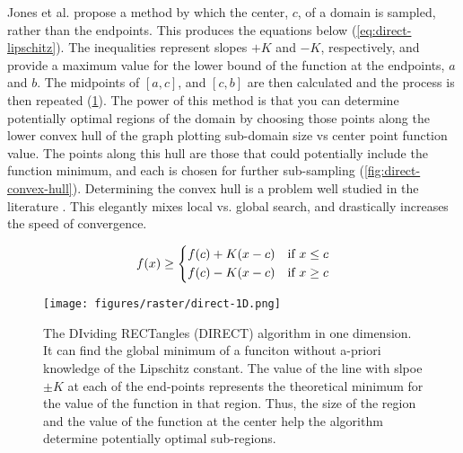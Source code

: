 Jones et al. \cite{jonesLipschitzianOptimizationLipschitz1993} propose a method by which the center, $c$, of a domain is sampled, rather than the endpoints. This produces the equations below (\cref{eq:direct-lipschitz}). The inequalities represent slopes $+K$ and $-K$, respectively, and provide a maximum value for the lower bound of the function at the endpoints, $a$ and $b$. The midpoints of $[a,c]$, and $[c,b]$ are then calculated and the process is then repeated (\cref{fig:direct-1D}). The power of this method is that you can determine potentially optimal regions of the domain by choosing those points along the lower convex hull of the graph plotting sub-domain size vs center point function value. The points along this hull are those that could potentially include the function minimum, and each is chosen for further sub-sampling (\cref{fig:direct-convex-hull}). Determining the convex hull is a problem well studied in the literature \cite{barberQuickhullAlgorithmConvex1996,chanOptimalOutputsensitiveConvex1996,jarvisIdentificationConvexHull1973,grahamEfficientAlgorithDetermining1972}. This elegantly mixes local vs. global search, and drastically increases the speed of convergence.


\begin{equation}
    f(x) \ge \begin{dcases}
        f(c) + K(x-c) & \text{if  } x \le c \\
        f(c) - K(x-c) & \text{if  } x \ge c
    \end{dcases}
    \label{eq:direct-lipschitz}
\end{equation}

\begin{figure}[h!]
    \begin{center}
        \texttt{[image: figures/raster/direct-1D.png]}
    \end{center}
    \caption[The DIviding RECTangles (DIRECT) algorithm in one dimension]{The DIviding RECTangles (DIRECT) algorithm in one dimension. It can find the global minimum of a funciton without a-priori knowledge of the Lipschitz constant. The value of the line with slpoe $\pm K$ at each of the end-points represents the theoretical minimum for the value of the function in that region. Thus, the size of the region and the value of the function at the center help the algorithm determine potentially optimal sub-regions.}
    \label{fig:direct-1D}
\end{figure}

